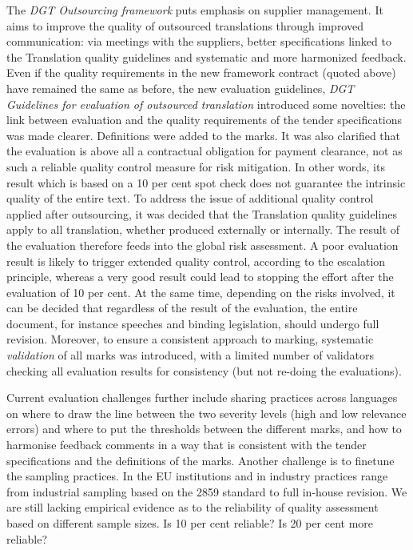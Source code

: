 \documentclass[output=paper]{langsci/langscibook}
\begin{document}
The \textit{DGT Outsourcing framework} \citep{DGT2016b} puts emphasis on supplier management. It aims to improve the quality of outsourced translations through improved communication: via meetings with the suppliers, better specifications linked to the Translation quality guidelines and systematic and more harmonized feedback. Even if the quality requirements in the new framework contract (quoted above) have remained the same as before, the new evaluation guidelines, \textit{DGT Guidelines for evaluation of outsourced translation} \citep{DGT2016a} introduced some novelties: the link between evaluation and the quality requirements of the tender specifications was made clearer. Definitions were added to the marks. It was also clarified that the evaluation is above all a contractual obligation for payment clearance, not as such a reliable quality control measure for risk mitigation. In other words, its result which is based on a 10 per cent spot check does not guarantee the intrinsic quality of the entire text. To address the issue of additional quality control applied after outsourcing, it was decided that the Translation quality guidelines apply to all translation, whether produced externally or internally. The result of the evaluation therefore feeds into the global risk assessment. A poor evaluation result is likely to trigger extended quality control, according to the escalation principle, whereas a very good result could lead to stopping the effort after the evaluation of 10 per cent. At the same time, depending on the risks involved, it can be decided that regardless of the result of the evaluation, the entire document, for instance speeches and binding legislation, should undergo full revision. Moreover, to ensure a consistent approach to marking, systematic \textit{validation} of all marks was introduced, with a limited number of validators checking all evaluation results for consistency (but not re-doing the evaluations).

Current evaluation challenges further include sharing practices across languages on where to draw the line between the two severity levels (high and low relevance errors) and where to put the thresholds between the different marks, and how to harmonise feedback comments in a way that is consistent with the tender specifications and the definitions of the marks. Another challenge is to finetune the sampling practices. In the EU institutions and in industry practices range from industrial sampling based on the \citeauthor{ISO2006} 2859 standard to full in-house revision. We are still lacking empirical evidence as to the reliability of quality assessment based on different sample sizes. Is 10 per cent reliable? Is 20 per cent more reliable?
\end{document}
